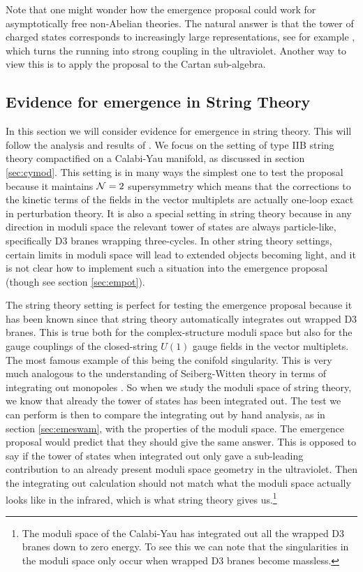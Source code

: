 \documentclass[11pt,a4paper]{article}
\numberwithin{equation}{section}
\numberwithin{table}{section}\setlength{\multlinegap}{25pt}
\begin{document}
{Note that one might wonder how the emergence proposal could work for asymptotically free non-Abelian theories. The natural answer is that the tower of charged states corresponds to increasingly large representations, see for example \cite{Heidenreich:2017sim}, which turns the running into strong coupling in the ultraviolet. Another way to view this is to apply the proposal to the Cartan sub-algebra. 

\subsection{Evidence for emergence in String Theory}
\label{sec:evemstrl}

In this section we will consider evidence for emergence in string theory. This will follow the analysis and results of \cite{Grimm:2018ohb}. We focus on the setting of type IIB string theory compactified on a Calabi-Yau manifold, as discussed in section \ref{sec:cymod}. This setting is in many ways the simplest one to test the proposal because it maintains ${\cal N}=2$ supersymmetry which means that the corrections to the kinetic terms of the fields in the vector multiplets are  actually one-loop exact in perturbation theory. It is also a special setting in string theory because in any direction in moduli space the relevant tower of states are always particle-like, specifically D3 branes wrapping three-cycles. In other string theory settings, certain limits in moduli space will lead to extended objects becoming light, and it is not clear how to implement such a situation into the emergence proposal (though see section \ref{sec:empot}). 

The string theory setting is perfect for testing the emergence proposal because it has been known since \cite{Strominger:1995cz} that string theory automatically integrates out wrapped D3 branes. This is true both for the complex-structure moduli space but also for the gauge couplings of the closed-string $U(1)$ gauge fields in the vector multiplets. The most famous example of this being the conifold singularity. This is very much analogous to the understanding of Seiberg-Witten theory in terms of integrating out monopoles \cite{Seiberg:1994rs}. So when we study the moduli space of string theory, we know that already the tower of states has been integrated out. The test we can perform is then to compare the integrating out by hand analysis, as in section \ref{sec:emeswam}, with the properties of the moduli space. The emergence proposal would predict that they should give the same answer. This is opposed to say if the tower of states when integrated out only gave a sub-leading contribution to an already present moduli space geometry in the ultraviolet. Then the integrating out calculation should not match what the moduli space actually looks like in the infrared, which is what string theory gives us.\footnote{The moduli space of the Calabi-Yau has integrated out all the wrapped D3 branes down to zero energy. To see this we can note that the singularities in the moduli space only occur when wrapped D3 branes become massless.} 

}
\end{document}
